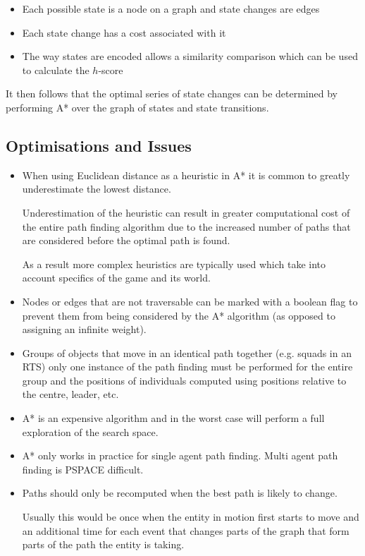 \documentclass[a4paper]{article}
\begin{document}
\begin{itemize}
  \item
    Each possible state is a node on a graph and state changes are edges

  \item
    Each state change has a cost associated with it

  \item
    The way states are encoded allows a similarity comparison which can be used
    to calculate the $h$-score
\end{itemize}

It then follows that the optimal series of state changes can be determined by
performing A* over the graph of states and state transitions.

\subsection{Optimisations and Issues}

\begin{itemize}
  \item
    When using Euclidean distance as a heuristic in A* it is common to greatly
    underestimate the lowest distance.

    Underestimation of the heuristic can result in greater computational cost of
    the entire path finding algorithm due to the increased number of paths that
    are considered before the optimal path is found.

    As a result more complex heuristics are typically used which take into
    account specifics of the game and its world.

  \item
    Nodes or edges that are not traversable can be marked with a boolean flag to
    prevent them from being considered by the A* algorithm (as opposed to
    assigning an infinite weight).

  \item
    Groups of objects that move in an identical path together (e.g. squads in an
    RTS) only one instance of the path finding must be performed for the entire
    group and the positions of individuals computed using positions relative to
    the centre, leader, etc.

  \item
    A* is an expensive algorithm and in the worst case will perform a full
    exploration of the search space.

  \item
    A* only works in practice for single agent path finding. Multi agent path
    finding is PSPACE difficult.

  \item
    Paths should only be recomputed when the best path is likely to change.

    Usually this would be once when the entity in motion first starts to move
    and an additional time for each event that changes parts of the graph that
    form parts of the path the entity is taking.

\end{itemize}
\end{document}
